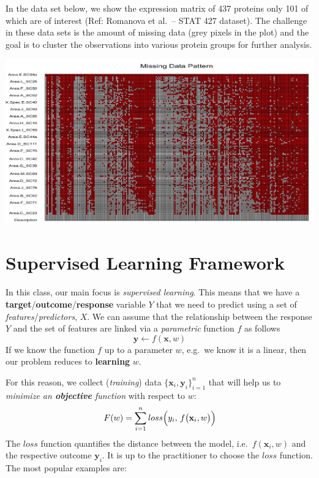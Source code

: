 \documentclass[
]{book}
\begin{document}
In the data set below, we show the expression matrix of 437 proteins only 101 of which are of interest (Ref: Romanova et al.~-- STAT 427 dataset). The challenge in these data sets is the amount of missing data (grey pixels in the plot) and the goal is to cluster the observations into various protein groups for further analysis.

\begin{center}\includegraphics[width=0.85\linewidth]{images/week1/chemistry} \end{center}

\section{Supervised Learning Framework}\label{supervised-learning-framework}

In this class, our main focus is \emph{supervised learning}. This means that we have a \textbf{target}/\textbf{outcome}/\textbf{response} variable \(Y\) that we need to predict using a set of \emph{features}/\emph{predictors}, \(X\). We can assume that the relationship between the response \(Y\) and the set of features are linked via a \emph{parametric} function \(f\) as follows
\[\mathbf{y} \longleftarrow f(\mathbf{x}, w) \]
If we know the function \(f\) up to a parameter \(w\), e.g.~we know it is a linear, then our problem reduces to \textbf{learning} \(w\).

For this reason, we collect (\emph{training}) data \(\bigl\{\mathbf{x}_i, \mathbf{y}_i  \bigr\}_{i=1}^{n}\) that will help us to \emph{minimize an \textbf{objective} function} with respect to \(w\):
\[F(w) = \sum_{i=1}^{n} loss \Bigl(y_i,\, f \bigl(\mathbf{x}_i, w \bigr) \Bigr)\]
The \(loss\) function quantifies the distance between the model, i.e.~\(f(\mathbf{x}_i, w)\) and the respective outcome \(\mathbf{y}_i\). It is up to the practitioner to choose the \(loss\) function. The most popular examples are:
\end{document}

